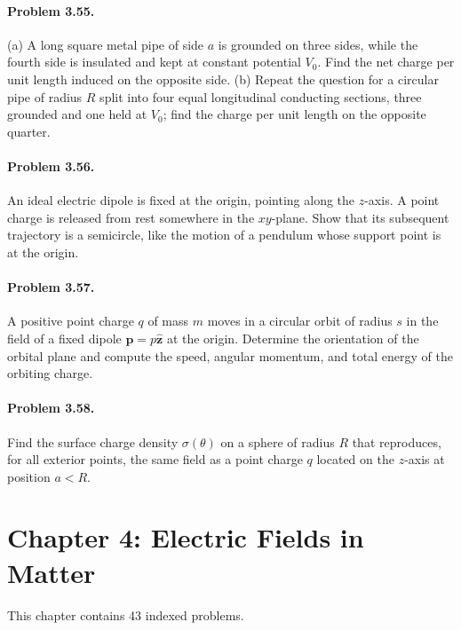 \documentclass{aa}
\newcommand{\problemstatement}[2]{%
\paragraph{Problem #1.}#2\par\medskip
}
\begin{document}
\problemstatement{3.55}{(a) A long square metal pipe of side \(a\) is grounded on three sides, while the fourth side is insulated and kept at constant potential \(V_0\). Find the net charge per unit length induced on the opposite side. (b) Repeat the question for a circular pipe of radius \(R\) split into four equal longitudinal conducting sections, three grounded and one held at \(V_0\); find the charge per unit length on the opposite quarter.}
\problemstatement{3.56}{An ideal electric dipole is fixed at the origin, pointing along the \(z\)-axis. A point charge is released from rest somewhere in the \(xy\)-plane. Show that its subsequent trajectory is a semicircle, like the motion of a pendulum whose support point is at the origin.}
\problemstatement{3.57}{A positive point charge \(q\) of mass \(m\) moves in a circular orbit of radius \(s\) in the field of a fixed dipole \(\mathbf{p}=p\hat{\mathbf{z}}\) at the origin. Determine the orientation of the orbital plane and compute the speed, angular momentum, and total energy of the orbiting charge.}
\problemstatement{3.58}{Find the surface charge density \(\sigma(\theta)\) on a sphere of radius \(R\) that reproduces, for all exterior points, the same field as a point charge \(q\) located on the \(z\)-axis at position \(a<R\).}

\section{Chapter 4: Electric Fields in Matter}
This chapter contains 43 indexed problems.
\end{document}
